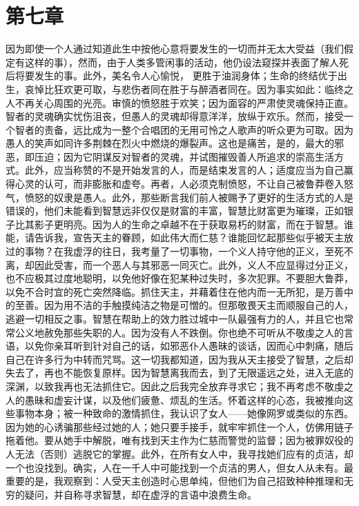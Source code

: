
\section{第七章}

因为即使一个人通过知道此生中按他心意将要发生的一切而并无太大受益（我们假定有这样的事），然而，由于人类多管闲事的活动，他仍设法窥探并表面了解人死后将要发生的事。此外，美名令人心愉悦， 更胜于油润身体；生命的终结优于出生，哀悼比狂欢更可取，与悲伤者同在胜于与醉酒者同在。因为事实如此：临终之人不再关心周围的光亮。审慎的愤怒胜于欢笑；因为面容的严肃使灵魂保持正直。智者的灵魂确实忧伤沮丧，但愚人的灵魂却得意洋洋，放纵于欢乐。然而，接受一个智者的责备，远比成为一整个合唱团的无用可怜之人歌声的听众更为可取。因为愚人的笑声如同许多荆棘在烈火中燃烧的爆裂声。这也是痛苦，是的，最大的邪恶，即压迫；因为它阴谋反对智者的灵魂，并试图摧毁善人所追求的崇高生活方式。此外，应当称赞的不是开始发言的人，而是结束发言的人；适度应当为自己赢得心灵的认可，而非膨胀和虚夸。再者，人必须克制愤怒，不让自己被鲁莽卷入怒气，愤怒的奴隶是愚人。此外，那些断言我们前人被赐予了更好的生活方式的人是错误的，他们未能看到智慧远非仅仅是财富的丰富，智慧比财富更为璀璨，正如银子比其影子更明亮。因为人的生命之卓越不在于获取易朽的财富，而在于智慧。谁能，请告诉我，宣告天主的眷顾，如此伟大而仁慈？谁能回忆起那些似乎被天主放过的事物？在我虚浮的往日，我考量了一切事物，一个义人持守他的正义，至死不离，却因此受害，而一个恶人与其邪恶一同灭亡。此外，义人不应显得过分正义，也不应极其过度地聪明，以免他好像在犯某种过失时，多次犯罪。不要胆大鲁莽，以免不合时宜的死亡突然降临。抓住天主，并藉着住在他内而一无所犯，是万善中的至善。因为用不洁的手触摸纯洁之物是可憎的。但那敬畏天主而顺服自己的人，逃避一切相反之事。智慧在帮助上的效力胜过城中一队最强有力的人，并且它也常常公义地赦免那些失职的人。因为没有人不跌倒。你也绝不可听从不敬虔之人的言语，以免你亲耳听到针对自己的话，如邪恶仆人愚昧的谈话，因而心中刺痛，随后自己在许多行为中转而咒骂。这一切我都知道，因为我从天主接受了智慧，之后却失去了，再也不能恢复原样。因为智慧离我而去，到了无限遥远之处，进入无底的深渊，以致我再也无法抓住它。因此之后我完全放弃寻求它；我不再考虑不敬虔之人的愚昧和虚妄计谋，以及他们疲惫、烦乱的生活。怀着这样的心态，我被推向这些事物本身；被一种致命的激情抓住，我认识了女人——她像网罗或类似的东西。因为她的心诱骗那些经过她的人；她只要手接手，就牢牢抓住一个人，仿佛用链子拖着他。要从她手中解脱，唯有找到天主作为仁慈而警觉的监督；因为被罪奴役的人无法（否则）逃脱它的掌握。此外，在所有女人中，我寻找她们应有的贞洁，却一个也没找到。确实，人在一千人中可能找到一个贞洁的男人，但女人从未有。最重要的是，我观察到：人受天主创造时心思单纯，但他们为自己招致种种推理和无穷的疑问，并自称寻求智慧，却在虚浮的言语中浪费生命。\par

